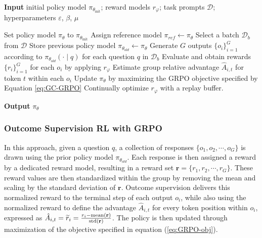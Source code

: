 \begin{itemize}[topsep=0pt]
\begin{algorithm}[t]
  \small
  \caption{Iterative Group Relative Policy Optimization}
  \textbf{Input} initial policy model $\pi_{\theta_{\text{init}}}$; reward models $r_\varphi$; task prompts $\mathcal{D}$; 
  hyperparameters $\varepsilon$, $\beta$, $\mu$
  \begin{algorithmic}[1]
    \State Set policy model $\pi_\theta$ to $\pi_{\theta_{\text{init}}}$
      \State Assign reference model $\pi_{ref} \gets \pi_\theta$
        \State Select a batch $\mathcal{D}_b$ from $\mathcal{D}$
        \State Store previous policy model $\pi_{\theta_{old}} \gets \pi_\theta$
        \State Generate $G$ outputs $\{o_i\}_{i=1}^G$ according to $\pi_{\theta_{old}} (\cdot \mid q)$ for each question $q$ in $\mathcal{D}_b$
        \State Evaluate and obtain rewards $\{r_i\}_{i=1}^{G}$ for each $o_i$ by applying $r_\varphi$
        \State Estimate group relative advantage $\hat{A}_{i,t}$ for token $t$ within each $o_i$
            \State Update $\pi_{\theta}$ by maximizing the GRPO objective specified by Equation \ref{eq:GC-GRPO}
        \EndFor
      \EndFor
      \State Continually optimize $r_\varphi$ with a replay buffer.
    \EndFor
  \end{algorithmic}
  \textbf{Output} $\pi_\theta$
  \label{alg:iter-grpo}
\end{algorithm}

\subsubsection{Outcome Supervision RL with GRPO} In this approach, given a question $q$, a collection of responses $\{o_1, o_2, \cdots, o_G\}$ is drawn using the prior policy model $\pi_{\theta_{old}}$. Each response is then assigned a reward by a dedicated reward model, resulting in a reward set $\mathbf{r}=\{r_1, r_2, \cdots, r_G\}$. These reward values are then standardized within the group by removing the mean and scaling by the standard deviation of $\mathbf{r}$. Outcome supervision delivers this normalized reward to the terminal step of each output $o_i$, while also using the normalized reward to define the advantage $\hat{A}_{i, t}$ for every token position within $o_i$, expressed as $\hat{A}_{i, t} = \widetilde{r}_i = \frac{r_i- {\rm mean}(\mathbf{r})}{{\rm std}(\mathbf{r})}$. The policy is then updated through maximization of the objective specified in equation (\ref{eq:GRPO-obj}).


\end{itemize}
